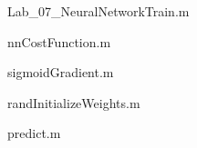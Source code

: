 \documentclass[10pt, a4paper]{article}
\begin{document}
Lab\_07\_NeuralNetworkTrain.m


\newpage
nnCostFunction.m


sigmoidGradient.m


randInitializeWeights.m


predict.m

\end{document}
